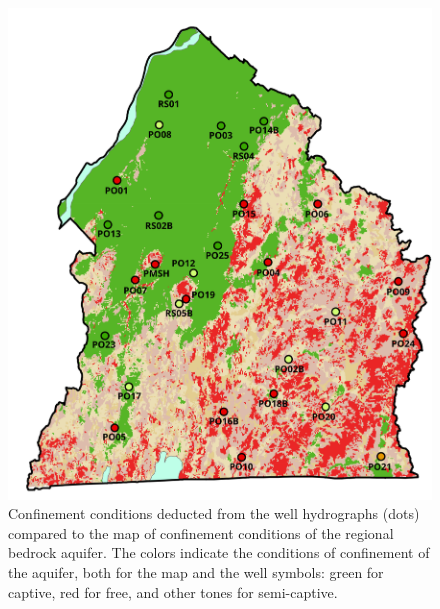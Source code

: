\documentclass[WHATMANUAL.tex]{subfiles}
\begin{document}
\begin{figure}
\centering
\includegraphics[height=0.85\textheight]{img/CONFINEMENTetPUITS}
\caption[Confinement conditions deducted from the well hydrographs compared to the map of confinement conditions of the regional bedrock aquifer.]{Confinement conditions deducted from the well hydrographs (dots) compared to the map of confinement conditions of the regional bedrock aquifer. The colors indicate the conditions of confinement of the aquifer, both for the map and the well symbols: green for captive, red for free, and other tones for semi-captive.}
\label{fig:tab_hydrograph_layout}
\end{figure}
\end{document}
